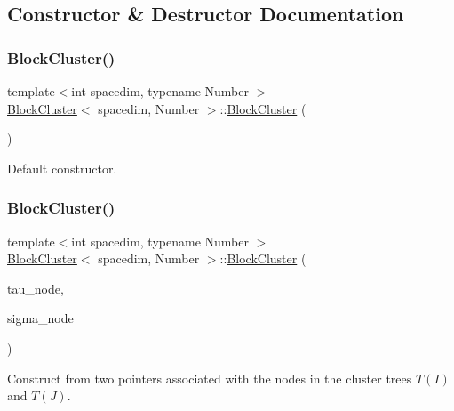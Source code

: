 \subsection{Constructor \& Destructor Documentation}
\mbox{\label{classBlockCluster_a0b85fdaddc12a14d57db884e287cd24e}} 
\subsubsection{\texorpdfstring{Block\+Cluster()}{BlockCluster()}\hspace{0.1cm}{\footnotesize\ttfamily [1/2]}}
{\footnotesize\ttfamily template$<$int spacedim, typename Number $>$ \\
\hyperlink{classBlockCluster}{Block\+Cluster}$<$ spacedim, Number $>$\+::\hyperlink{classBlockCluster}{Block\+Cluster} (\begin{DoxyParamCaption}{ }\end{DoxyParamCaption})}

Default constructor. \mbox{\label{classBlockCluster_a63fdb3f4bea6a446b34cb34274731df0}} 
\subsubsection{\texorpdfstring{Block\+Cluster()}{BlockCluster()}\hspace{0.1cm}{\footnotesize\ttfamily [2/2]}}
{\footnotesize\ttfamily template$<$int spacedim, typename Number $>$ \\
\hyperlink{classBlockCluster}{Block\+Cluster}$<$ spacedim, Number $>$\+::\hyperlink{classBlockCluster}{Block\+Cluster} (\begin{DoxyParamCaption}\item[{typename \hyperlink{classClusterTree}{Cluster\+Tree}$<$ spacedim, Number $>$\+::node\+\_\+pointer\+\_\+type}]{tau\+\_\+node,  }\item[{typename \hyperlink{classClusterTree}{Cluster\+Tree}$<$ spacedim, Number $>$\+::node\+\_\+pointer\+\_\+type}]{sigma\+\_\+node }\end{DoxyParamCaption})}

Construct from two pointers associated with the nodes in the cluster trees $T(I)$ and $T(J)$.


